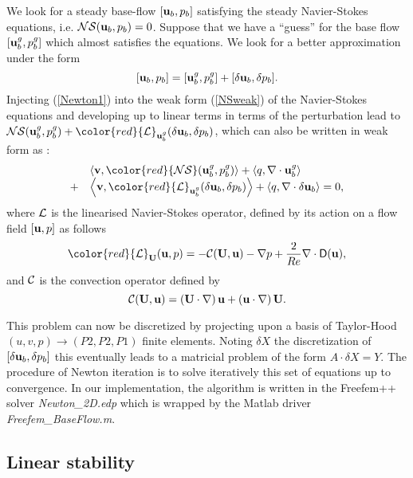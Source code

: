 \documentclass[twocolumn,10pt]{asme2ej}
\newcommand{\be}[1]{ \begin{equation} \label{#1}}
\newcommand{\ee}{\end{equation}}
\newcommand{\bes}[1]{ \begin{equation} \label{#1}\begin{array}{rl}}
\newcommand{\ees}{\end{array}\end{equation}}
\begin{document}
We look for a steady base-flow {\color{red}$[{\bf u}_b,p_b]$} satisfying the steady Navier-Stokes equations, i.e. 
{\color{red}${\cal NS} ({\bf u}_b,p_b) = 0$.}
Suppose that we have a {\color{red}``guess''}  for the base flow $[{\bf u}_b^g,p_b^g]$  which almost satisfies the equations.  We look for a better approximation under the form
\be{Newton1}
[{\bf u}_b,p_b]  = [{\bf u}_b^g,p_b^g] + [\delta {\bf u}_b, \delta p_b].
\ee
Injecting (\ref{Newton1}) into the weak form (\ref{NSweak}) of the Navier-Stokes equations and developing up to linear terms in terms of the perturbation lead to  
${\cal NS}  ({\bf u}_b^g,p_b^g) + {\color{red} {\cal L} _{{\bf u}_b^g}(\delta {\bf u}_b,\delta p_b)}$, which can also be written in weak form as :
\bes{Newton2}
&\left< {\bf v}, {\color{red}{\cal NS} ({\bf u}_b^g,p_b^g)}\right> + \left<q, \nabla \cdot {\bf u}_b^g\right>  
\\
+ &\left< { \bf v}, {\color{red}{\cal L} _{{\bf u}_b^g}( \delta {\bf u}_b,\delta p_b) }\right> + \left<q, \nabla \cdot \delta{\bf u}_b\right> = 0,
\ees
where ${\cal L}$ is the linearised Navier-Stokes operator, defined by its action on a flow field {\color{red}$[{\bf u} , p]$} as follows 
\be{defNSL}
{\color{red} {\cal L}_{{\bf U}}( {\bf u}, p)} = - {\cal C}( {\bf U} , {\bf u}) -\nabla p
+\frac{2}{Re} \nabla  \cdot {\mathsf{D}}({\bf u}), %
 \ee
and ${\cal C}$ is the convection operator defined by 
\be{defC}
{\cal C}( {\bf U} , {\bf u}) = \left( {\bf U} \cdot \nabla \right) {\bf u} + \left( {\bf u} \cdot \nabla \right)  {\bf U}.
\ee

This problem can now be discretized by projecting upon a basis of Taylor-Hood $(u,v,p) \rightarrow (P2,P2,P1)$ finite elements. Noting $\delta X$ the discretization of {\color{red}$[\delta {\bf u}_b,\delta p_b]$} this eventually leads to a matricial problem of the form $A \cdot \delta X = Y$. The procedure of Newton iteration is to solve iteratively this set of equations up to convergence.
In our implementation, the algorithm is written in the Freefem++ solver {\em Newton\_2D.edp} 
which is wrapped by the Matlab driver {\em Freefem\_BaseFlow.m}.

\subsection{Linear stability}
\vspace{.2cm}
\end{document}
